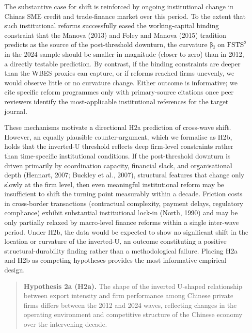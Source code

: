 \documentclass[12pt,a4paper]{article}
\begin{document}
The substantive case for shift is reinforced by ongoing institutional
change in China\textquotesingle s SME credit and trade-finance market
over this period. To the extent that such institutional reforms
successfully eased the working-capital binding constraint that the
Manova (2013) and Foley and Manova (2015) tradition predicts as the
source of the post-threshold downturn, the curvature β₂ on
\(\mathrm{FSTS}^2\) in the 2024 sample should be smaller in magnitude
(closer to zero) than in 2012, a directly testable prediction. By
contrast, if the binding constraints are deeper than the WBES proxies
can capture, or if reforms reached firms unevenly, we would observe
little or no curvature change. Either outcome is informative; we cite
specific reform programmes only with primary-source citations once peer
reviewers identify the most-applicable institutional references for the
target journal.

These mechanisms motivate a directional H2a prediction of cross-wave
shift. However, an equally plausible counter-argument, which we
formalise as H2b, holds that the inverted-U threshold reflects deep
firm-level constraints rather than time-specific institutional
conditions. If the post-threshold downturn is driven primarily by
coordination capacity, financial slack, and organisational depth
(Hennart, 2007; Buckley et al., 2007), structural features that change
only slowly at the firm level, then even meaningful institutional reform
may be insufficient to shift the turning point measurably within a
decade. Friction costs in cross-border transactions (contractual
complexity, payment delays, regulatory compliance) exhibit substantial
institutional lock-in (North, 1990) and may be only partially relaxed by
macro-level finance reforms within a single inter-wave period. Under
H2b, the data would be expected to show no significant shift in the
location or curvature of the inverted-U, an outcome constituting a
positive structural-durability finding rather than a methodological
failure. Placing H2a and H2b as competing hypotheses provides the most
informative empirical design.

\begin{quote}
\textbf{Hypothesis 2a (H2a).} The shape of the inverted U‑shaped
relationship between export intensity and firm performance among Chinese
private firms differs between the 2012 and 2024 waves, reflecting
changes in the operating environment and competitive structure of the
Chinese economy over the intervening decade.
\end{quote}
\end{document}
